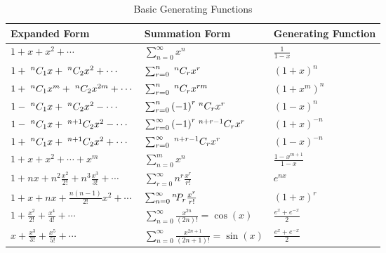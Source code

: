 \begin{table}[h]
    \renewcommand{\arraystretch}{1.5}
    \centering
    \begin{tabularx}{\textwidth}{Xll}
        \toprule
        \textbf{Expanded Form}                                        & \textbf{Summation Form}                                       & \textbf{Generating Function}   \\
        \midrule
        \mbox{$1+x+x^2+\cdots$}                                       & \mbox{$\sum_{n=0}^{\infty} x^n$}                              & \mbox{$\frac{1}{1-x}$}         \\
        \mbox{$1 + \;{}^{n}C_{1}x + \;{}^{n}C_{2}x^2 + \cdots $}      & \mbox{$\sum_{r=0}^{n} \;{}^{n}C_{r} x^r$}                     & \mbox{${(1+x)}^n$}             \\
        \mbox{$1 + \;{}^{n}C_{1}x^m + \;{}^{n}C_{2}x^{2m} + \cdots $} & \mbox{$\sum_{r=0}^{n} \;{}^{n}C_{r} x^{rm}$}                  & \mbox{${(1+x^m)}^{n}$}         \\
        \mbox{$1 - \;{}^{n}C_{1}x + \;{}^{n}C_{2}x^2 - \cdots $}      & \mbox{$\sum_{r=0}^{n} {(-1)}^r \;{}^{n}C_{r} x^r$}            & \mbox{${(1-x)}^n$}             \\
        \mbox{$1 - \;{}^{n}C_{1}x + \;{}^{n+1}C_{2}x^2 - \cdots$}     & \mbox{$\sum_{r=0}^{\infty} {(-1)}^r \;{}^{n+r-1}C_{r} x^r$}   & \mbox{${(1+x)}^{-n}$}          \\
        \mbox{$1 + \;{}^{n}C_{1}x + \;{}^{n+1}C_{2}x^2 + \cdots$}     & \mbox{$\sum_{r=0}^{\infty} \;{}^{n+r-1}C_{r} x^r$}            & \mbox{${(1-x)}^{-n}$}          \\
        \mbox{$1+x+x^2+\cdots+x^m$}                                   & \mbox{$\sum_{n=0}^{m} x^n$}                                   & \mbox{$\frac{1-x^{m+1}}{1-x}$} \\
        \mbox{$1+nx+n^2\frac{x^2}{2!}+n^3\frac{x^3}{3!}+\cdots$}      & \mbox{$\sum_{r=0}^{\infty} n^r \frac{x^r}{r!}$}               & \mbox{$e^{nx}$}                \\
        \mbox{$1+x+nx+\frac{n(n-1)}{2!}x^2+\cdots$}                   & \mbox{$\sum_{n=0}^{\infty} {}^{n}\!P_{r} \frac{x^r}{r!}$}       & \mbox{${(1+x)}^r$}             \\
        \mbox{$1+\frac{x^2}{2!}+\frac{x^4}{4!}+\cdots$}               & \mbox{$\sum_{n=0}^{\infty} \frac{x^{2n}}{(2n)!}=\cos(x)$}     & \mbox{$\frac{e^x+e^{-x}}{2}$}  \\
        \mbox{$x+\frac{x^3}{3!}+\frac{x^5}{5!}+\cdots$}               & \mbox{$\sum_{n=0}^{\infty} \frac{x^{2n+1}}{(2n+1)!}=\sin(x)$} & \mbox{$\frac{e^x+e^{-x}}{2}$}  \\
        \bottomrule
    \end{tabularx}
    \caption{Basic Generating Functions}\label{tab:basic_generating_functions}
\end{table}


